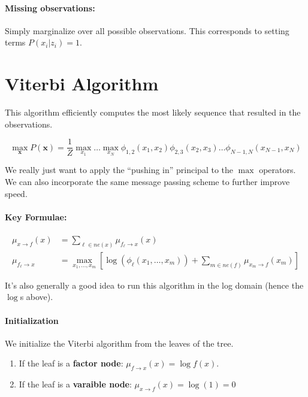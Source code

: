 \documentclass[a4paper,12pt]{report}
\begin{document}
\paragraph{Missing observations: } Simply marginalize over all possible observations. This corresponds to setting terms $P(x_i | z_i) = 1$.



\section{Viterbi Algorithm}

This algorithm efficiently computes the most likely sequence that resulted in the observations. 

\begin{equation}
\max_{\pmb x} P(\pmb x) = \frac{1}{Z} \max_{x_1}\dots\max_{x_N} \phi_{1,2}(x_1,x_2) \phi_{2,3}(x_2, x_3) \dots \phi_{N-1,N}(x_{N-1}, x_N)
\end{equation}

We really just want to apply the ``pushing in'' principal to the $\max$ operators. We can also incorporate the same message passing scheme to further improve speed. 

\paragraph{Key Formulae: } 
\begin{equation}
\begin{split}
\mu_{x\to f}(x) &= \sum_{\ell \in ne(x)}^{} \mu_{f_\ell \to x}(x) \\
\mu_{f_\ell \to x} &= \max_{x_1, \dots, x_m} [\log(\phi_\ell(x_1, \dots, x_m)) + \sum_{m\in ne(f)}^{} \mu_{x_m \to f}(x_m) ]
\end{split}
\end{equation}


It's also generally a good idea to run this algorithm in the log domain (hence the $\log$s above).

\paragraph{Initialization} 

We initialize the Viterbi algorithm from the leaves of the tree. 
\begin{enumerate}
\item If the leaf is a \textbf{factor node}: $\mu_{f\to x}(x) = \log f(x)$.
\item If the leaf is a \textbf{varaible node}: $\mu_{x\to f}(x) = \log(1) = 0$
\end{enumerate}
\end{document}
